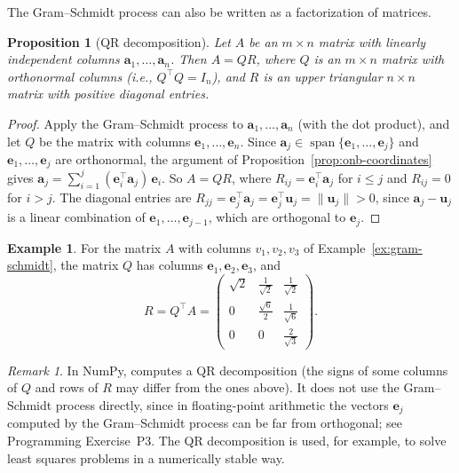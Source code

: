 \documentclass[11pt]{article}
\newcommand{\py}[1]{\texttt{\detokenize{#1}}}
\newcommand{\norm}[1]{\lVert #1 \rVert}
\theoremstyle{definition}
\newtheorem{example}[definition]{Example}
\theoremstyle{plain}
\newtheorem{proposition}[definition]{Proposition}
\theoremstyle{remark}
\newtheorem{remark}[definition]{Remark}
\DeclareMathOperator{\Span}{span}
\begin{document}
The Gram--Schmidt process can also be written as a factorization of matrices.

\begin{proposition}[QR decomposition]\label{prop:qr}
    Let $A$ be an $m \times n$ matrix with linearly independent columns $\mathbf{a}_1, \ldots, \mathbf{a}_n$. Then $A = QR$, where $Q$ is an $m \times n$ matrix with orthonormal columns (i.e., $Q^\top Q = I_n$), and $R$ is an upper triangular $n \times n$ matrix with positive diagonal entries.
\end{proposition}

\begin{proof}
    Apply the Gram--Schmidt process to $\mathbf{a}_1, \ldots, \mathbf{a}_n$ (with the dot product), and let $Q$ be the matrix with columns $\mathbf{e}_1, \ldots, \mathbf{e}_n$. Since $\mathbf{a}_j \in \Span\{\mathbf{e}_1, \ldots, \mathbf{e}_j\}$ and $\mathbf{e}_1, \ldots, \mathbf{e}_j$ are orthonormal, the argument of Proposition~\ref{prop:onb-coordinates} gives $\mathbf{a}_j = \sum_{i=1}^{j} (\mathbf{e}_i^\top \mathbf{a}_j)\, \mathbf{e}_i$. So $A = QR$, where $R_{ij} = \mathbf{e}_i^\top \mathbf{a}_j$ for $i \leq j$ and $R_{ij} = 0$ for $i > j$. The diagonal entries are $R_{jj} = \mathbf{e}_j^\top \mathbf{a}_j = \mathbf{e}_j^\top \mathbf{u}_j = \norm{\mathbf{u}_j} > 0$, since $\mathbf{a}_j - \mathbf{u}_j$ is a linear combination of $\mathbf{e}_1, \ldots, \mathbf{e}_{j-1}$, which are orthogonal to $\mathbf{e}_j$.
\end{proof}

\begin{example}
    For the matrix $A$ with columns $v_1, v_2, v_3$ of Example~\ref{ex:gram-schmidt}, the matrix $Q$ has columns $\mathbf{e}_1, \mathbf{e}_2, \mathbf{e}_3$, and
    \[R = Q^\top A = \begin{pmatrix} \sqrt{2} & \frac{1}{\sqrt{2}} & \frac{1}{\sqrt{2}} \\ 0 & \frac{\sqrt{6}}{2} & \frac{1}{\sqrt{6}} \\ 0 & 0 & \frac{2}{\sqrt{3}} \end{pmatrix}.\]
\end{example}

\begin{remark}
    In NumPy, \py{Q, R = np.linalg.qr(A)} computes a QR decomposition (the signs of some columns of $Q$ and rows of $R$ may differ from the ones above). It does not use the Gram--Schmidt process directly, since in floating-point arithmetic the vectors $\mathbf{e}_j$ computed by the Gram--Schmidt process can be far from orthogonal; see Programming Exercise~P3. The QR decomposition is used, for example, to solve least squares problems in a numerically stable way.
\end{remark}
\end{document}
